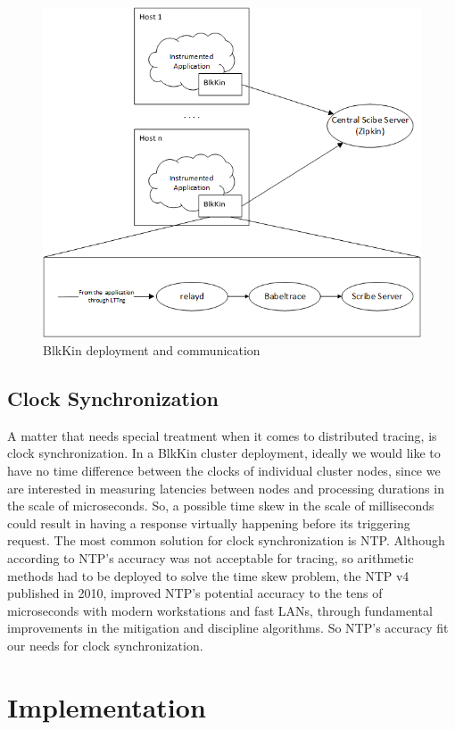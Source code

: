 \documentclass[11pt,journal,compsoc]{IEEEtran}
\begin{document}
\begin{figure}[h!]
  \centering
  \includegraphics[scale=0.5]{figs/blkin2.png}
  \caption{BlkKin deployment and communication}
  \label{fig:blkin}
\end{figure}

\subsection{Clock Synchronization}

A matter that needs special treatment when it comes to distributed
tracing, is clock synchronization. In a BlkKin cluster deployment, ideally we
would like to have no time difference between the clocks of individual cluster
nodes, since we are interested in measuring latencies between nodes and
processing durations in the scale of microseconds. So, a possible time skew in
the scale of milliseconds could result in having a response virtually happening
before its triggering request. The most common solution for clock
synchronization is NTP. Although according to \cite{hp} NTP's accuracy was not
acceptable for tracing, so arithmetic methods had to be deployed to solve the
time skew problem, the NTP v4 published in 2010, improved NTP's potential
accuracy to the tens of microseconds with modern workstations and fast LANs,
through fundamental improvements in the mitigation and discipline algorithms.
So NTP's accuracy fit our needs for clock synchronization.

\section{Implementation}
\end{document}
